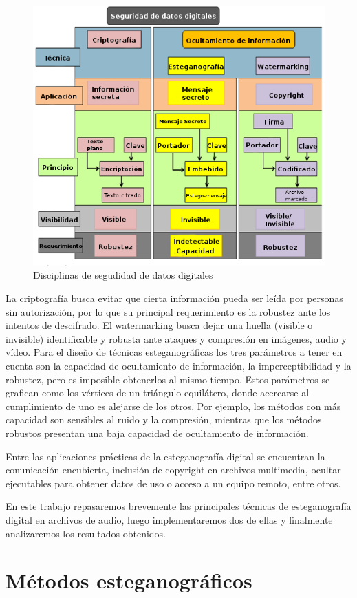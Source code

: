 \documentclass[conference,a4paper,10pt, oneside,final]{tfmpd}
\begin{document}
\begin{figure}[h!]
 \centering
 \includegraphics[keepaspectratio=true, width=240 px]{./cuadro.png}
 \caption{Disciplinas de segudidad de datos digitales}
 \label{fig: Disciplinas de segudidad de datos digitales}
\end{figure}

La criptografía busca evitar que cierta información pueda ser leída por personas sin autorización, por lo que su principal requerimiento es la robustez ante los intentos de descifrado. El watermarking busca dejar una huella (visible o invisible) identificable y robusta ante ataques y compresión en imágenes, audio y vídeo. Para el diseño de técnicas esteganográficas los tres parámetros a tener en cuenta son la capacidad de ocultamiento de información, la imperceptibilidad y la robustez, pero es imposible obtenerlos al mismo tiempo. Estos parámetros se grafican como los vértices de un triángulo equilátero, donde acercarse al cumplimiento de uno es alejarse de los otros. Por ejemplo, los métodos con más capacidad son sensibles al ruido y la compresión, mientras que los métodos robustos presentan una baja capacidad de ocultamiento de información.

Entre las aplicaciones prácticas de la esteganografía digital se encuentran la conunicación encubierta, inclusión de copyright en archivos multimedia, ocultar ejecutables para obtener datos de uso o acceso a un equipo remoto, entre otros.

En este trabajo repasaremos brevemente las principales técnicas de esteganografía digital en archivos de audio, luego implementaremos dos de ellas y finalmente analizaremos los resultados obtenidos.

\section{Métodos esteganográficos \cite{journals/ejasmp/DjebbarA12}}
\end{document}

